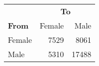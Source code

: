 
\begin{tabular}{lrr}
    \toprule
    & \multicolumn{2}{c}{\textbf{To}} \\
    \cmidrule(l){2-3}
    \textbf{From} & Female & Male  \\
    \midrule
    Female&7529&8061 \\
    Male&5310&17488 \\
    \bottomrule
\end{tabular}

